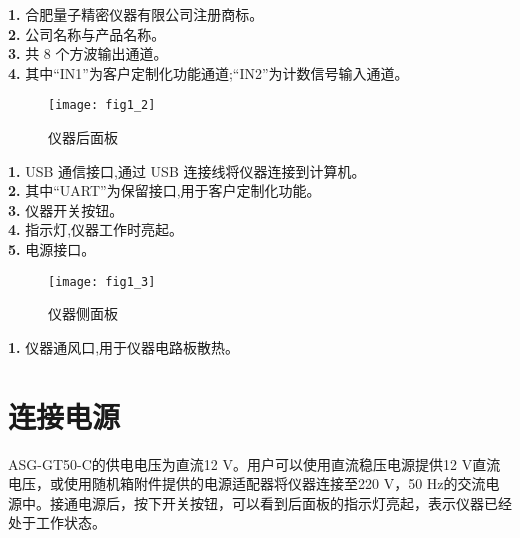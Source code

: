 \noindent \textbf{1.} 合肥量子精密仪器有限公司注册商标。\\
\textbf{2.}  公司名称与产品名称。\\
\textbf{3.}  共 8 个方波输出通道。\\
\textbf{4.}  其中“IN1”为客户定制化功能通道;“IN2”为计数信号输入通道。

\newpage
\begin{figure}[ht]
\centering
\texttt{[image: fig1\_2]}
\caption{仪器后面板}\label{fig:fig1_2}
\end{figure}

\noindent \textbf{1.} USB 通信接口,通过 USB 连接线将仪器连接到计算机。\\
\textbf{2.} 其中“UART”为保留接口,用于客户定制化功能。\\
\textbf{3.} 仪器开关按钮。\\
\textbf{4.} 指示灯,仪器工作时亮起。\\
\textbf{5.} 电源接口。

\begin{figure}[ht]
\centering
\texttt{[image: fig1\_3]}
\caption{仪器侧面板}\label{fig:fig1_3}
\end{figure}
\noindent \textbf{1.} 仪器通风口,用于仪器电路板散热。


\section{\heiti 连接电源}
ASG-GT50-C的供电电压为直流12 V。用户可以使用直流稳压电源提供12 V直流电压，或使用随机箱附件提供的电源适配器将仪器连接至220 V，50 Hz的交流电源中。接通电源后，按下开关按钮，可以看到后面板的指示灯亮起，表示仪器已经处于工作状态。

